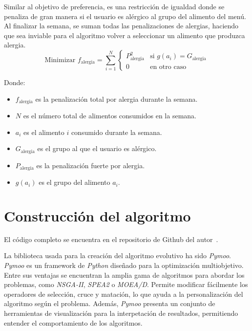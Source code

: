 Similar al objetivo de preferencia, es una restricción de igualdad donde se penaliza de gran manera si el usuario es alérgico al grupo del alimento del menú. Al finalizar la semana, se suman todas las penalizaciones de alergias, haciendo que sea inviable para el algoritmo volver a seleccionar un alimento que produzca alergia.
\[
\text{Minimizar } f_{\text{alergia}} = \sum_{i=1}^{N} 
\begin{cases} 
P_{\text{alergia}}^2 & \text{si } g(a_i) = G_{\text{alergia}} \\
0 & \text{en otro caso}
\end{cases}
\]
\begin{small}
    Donde:
    \begin{itemize}
    \item \( f_{\text{alergia}} \) es la penalización total por alergia durante la semana.
    \item \( N \) es el número total de alimentos consumidos en la semana.
    \item \( a_i \) es el alimento \( i \) consumido durante la semana.
    \item \( G_{\text{alergia}} \) es el grupo al que el usuario es alérgico.
    \item \( P_{\text{alergia}} \) es la penalización fuerte por alergia.
    \item \( g(a_i) \) es el grupo del alimento \( a_i \).
    \end{itemize}
\end{small}

\section{Construcción del algoritmo}
\label{ch:explicacion-algoritmo}

El código completo se encuentra en el repositorio de Github del autor~\cite{quesada_nutritionplanning}.

La biblioteca usada para la creación del algoritmo evolutivo ha sido \textit{Pymoo}. \textit{Pymoo} es un framework de \textit{Python} diseñado para la optimización multiobjetivo. Entre sus ventajas se encuentran la amplia gama de algoritmos para abordar los problemas, como \textit{NSGA-II}, \textit{SPEA2} o \textit{MOEA/D}. Permite modificar fácilmente los operadores de selección, cruce y matación, lo que ayuda a la personalización del algoritmo según el problema. Además, \textit{Pymoo} presenta un conjunto de herramientas de visualización para la interpetación de resultados, permitiendo entender el comportamiento de los algoritmos.~\cite{pymoo}

